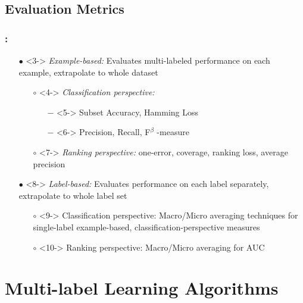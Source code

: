 \documentclass{beamer}
\begin{document}
\subsection{Evaluation Metrics}
\begin{frame}
\frametitle{\insertsection : \insertsubsection}
\begin{itemize}
\item[$\bullet$] <3-> \emph{Example-based: }Evaluates multi-labeled performance on each example, extrapolate to whole dataset
\begin{itemize}
\item[$\circ$] <4-> \emph{Classification perspective:}
\begin{itemize}
\item[$-$] <5-> Subset Accuracy, Hamming Loss
\item[$-$] <6-> Precision, Recall,  F$^\beta$ -measure
\end{itemize}
\item[$\circ$] <7-> \emph{Ranking perspective:} one-error, coverage, ranking loss, average precision
\end{itemize}
\item[$\bullet$] <8-> \emph{Label-based: }Evaluates performance on each label separately, extrapolate to whole label set
\begin{itemize}
\item[$\circ$] <9-> Classification perspective: Macro/Micro averaging techniques for single-label example-based, classification-perspective measures
\item[$\circ$] <10-> Ranking perspective: Macro/Micro averaging for AUC
\end{itemize}
\end{itemize}
\end{frame}
\section{Multi-label Learning Algorithms}
\end{document}
